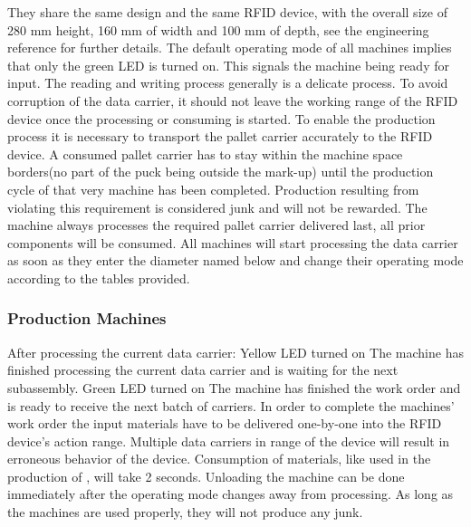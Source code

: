 \documentclass[12pt,twoside]{article}
\begin{document}
They share the same design and the same RFID device, with the overall
size of 280 mm height, 160 mm of width and 100 mm of depth, see the
engineering reference for further details. The default operating mode
of all machines implies that only the green LED is turned on. This
signals the machine being ready for input. The reading and writing
process generally is a delicate process. To avoid corruption of the
data carrier, it should not leave the working range of the RFID device
once the processing or consuming is started. To enable the production
process it is necessary to transport the pallet carrier accurately to
the RFID device. A consumed pallet carrier has to stay within the
machine space borders(no part of the puck being outside the mark-up)
until the production cycle of that very machine has been
completed. Production resulting from violating this requirement is
considered junk and will not be rewarded. The machine always processes
the required pallet carrier delivered last, all prior components will
be consumed. All machines will start processing the data carrier as
soon as they enter the diameter named below and change their operating
mode according to the tables provided.


\subsubsection{Production Machines}
After processing the current data carrier: Yellow LED turned on The
machine has finished processing the current data carrier and is
waiting for the next subassembly. Green LED turned on The machine has
finished the work order and is ready to receive the next batch of
carriers. In order to complete the machines' work order the input
materials have to be delivered one-by-one into the RFID device's
action range. Multiple data carriers in range of the device will
result in erroneous behavior of the device. Consumption of materials,
like  used in the production of , will take 2 seconds. Unloading
the machine can be done immediately after the operating mode changes
away from processing. As long as the machines are used properly, they
will not produce any junk.
\end{document}
